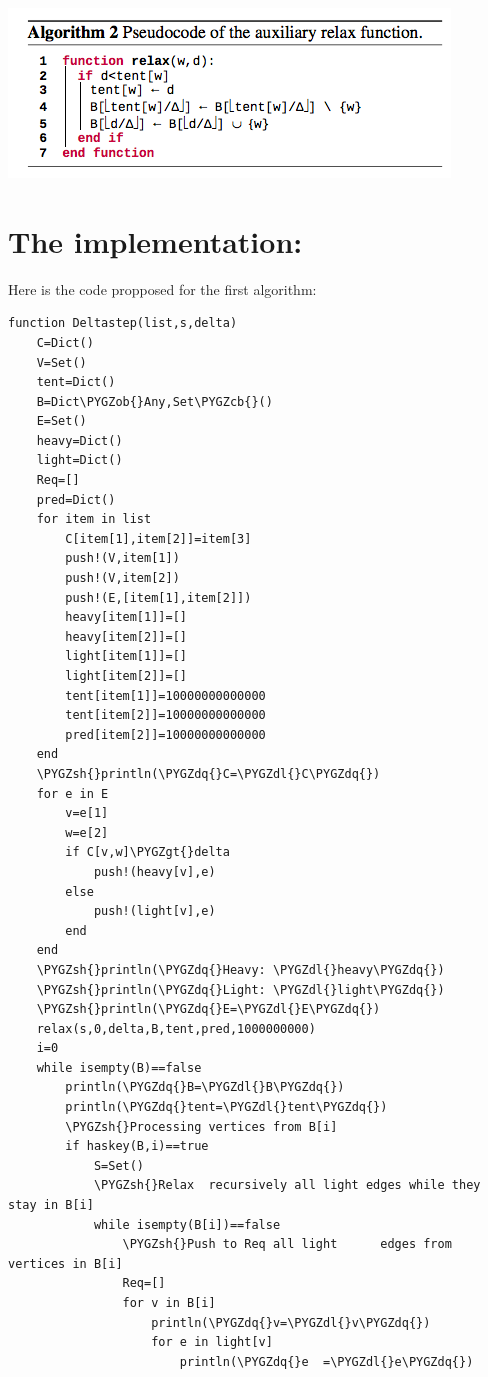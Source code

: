 \documentclass[letterpaper,10pt,english]{sphinxmanual}
\def\PYGZob{\char`\{}
\def\PYGZcb{\char`\}}
\def\PYGZgt{\char`\>}
\def\PYGZsh{\char`\#}
\def\PYGZdl{\char`\$}
\def\PYGZdq{\char`\"}
\begin{document}
\includegraphics{algo_2.png}


\section{The implementation:}
\label{Algorithm:the-implementation}
Here is the code propposed for the first algorithm:

\begin{Verbatim}[commandchars=\\\{\}]
    function Deltastep(list,s,delta)
    C=Dict()
    V=Set()
    tent=Dict()
    B=Dict\PYGZob{}Any,Set\PYGZcb{}()
    E=Set()
    heavy=Dict()
    light=Dict()
    Req=[]
    pred=Dict()
    for item in list
        C[item[1],item[2]]=item[3]
        push!(V,item[1])
        push!(V,item[2])
        push!(E,[item[1],item[2]])
        heavy[item[1]]=[]
        heavy[item[2]]=[]
        light[item[1]]=[]
        light[item[2]]=[]
        tent[item[1]]=10000000000000
        tent[item[2]]=10000000000000
        pred[item[2]]=10000000000000
    end
    \PYGZsh{}println(\PYGZdq{}C=\PYGZdl{}C\PYGZdq{})
    for e in E
        v=e[1]
        w=e[2]
        if C[v,w]\PYGZgt{}delta
            push!(heavy[v],e)
        else
            push!(light[v],e)
        end
    end
    \PYGZsh{}println(\PYGZdq{}Heavy: \PYGZdl{}heavy\PYGZdq{})
    \PYGZsh{}println(\PYGZdq{}Light: \PYGZdl{}light\PYGZdq{})
    \PYGZsh{}println(\PYGZdq{}E=\PYGZdl{}E\PYGZdq{})
    relax(s,0,delta,B,tent,pred,1000000000)
    i=0
    while isempty(B)==false
        println(\PYGZdq{}B=\PYGZdl{}B\PYGZdq{})
        println(\PYGZdq{}tent=\PYGZdl{}tent\PYGZdq{})
        \PYGZsh{}Processing vertices from B[i]
        if haskey(B,i)==true
            S=Set()
            \PYGZsh{}Relax  recursively all light edges while they stay in B[i]
            while isempty(B[i])==false
                \PYGZsh{}Push to Req all light      edges from      vertices in B[i]
                Req=[]
                for v in B[i]
                    println(\PYGZdq{}v=\PYGZdl{}v\PYGZdq{})
                    for e in light[v]
                        println(\PYGZdq{}e  =\PYGZdl{}e\PYGZdq{})

\end{Verbatim}
\end{document}
